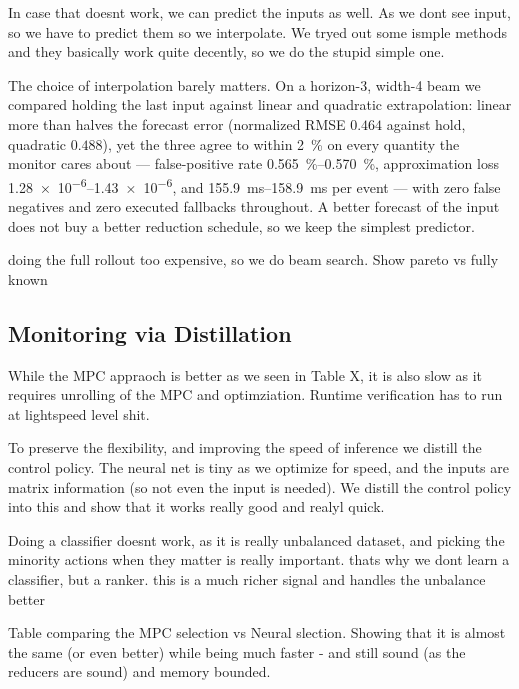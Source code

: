 \documentclass[letterpaper, 10 pt, conference]{ieeeconf}  %
\begin{document}
In case that doesnt work, we can predict the inputs as well. As we dont see input, so we have to predict them so we interpolate. We tryed out some ismple methods and they basically work quite decently, so we do the stupid simple one.


The choice of interpolation barely matters.
On a horizon-3, width-4 beam we compared holding the last input against linear
and quadratic extrapolation: linear more than halves the forecast error
(normalized RMSE $0.464$ against hold, quadratic $0.488$), yet the three agree
to within \SI{2}{\percent} on every quantity the monitor cares about ---
false-positive rate \SIrange{0.565}{0.570}{\percent}, approximation loss
\numrange{1.28e-6}{1.43e-6}, and \SIrange{155.9}{158.9}{\milli\second} per event
--- with zero false negatives and zero executed fallbacks throughout.
A better forecast of the input does not buy a better reduction schedule, so we
keep the simplest predictor.


doing the full rollout too expensive, so we do beam search. Show pareto vs fully known 



\subsection{Monitoring via Distillation}
While the MPC appraoch is better as we seen in Table X, it is also slow as it requires unrolling of the MPC and optimziation. Runtime verification has to run at lightspeed level shit.


To preserve the flexibility, and improving the speed of inference we distill the control policy. The neural net is tiny as we optimize for speed, and the inputs are matrix information (so not even the input is needed). We distill the control policy into this and show that it works really good and realyl quick.


Doing a classifier doesnt work, as it is really unbalanced dataset, and picking the minority actions when they matter is really important. thats why we dont learn a classifier, but a ranker. this is a much richer signal and handles the unbalance better


Table comparing the MPC selection vs Neural slection. Showing that it is almost the same (or even better) while being much faster - and still sound (as the reducers are sound) and memory bounded. 
\end{document}
